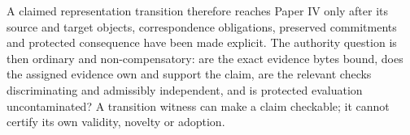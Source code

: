 A claimed representation transition therefore reaches Paper IV only after its source and target objects, correspondence obligations, preserved commitments and protected consequence have been made explicit. The authority question is then ordinary and non-compensatory: are the exact evidence bytes bound, does the assigned evidence own and support the claim, are the relevant checks discriminating and admissibly independent, and is protected evaluation uncontaminated? A transition witness can make a claim checkable; it cannot certify its own validity, novelty or adoption.